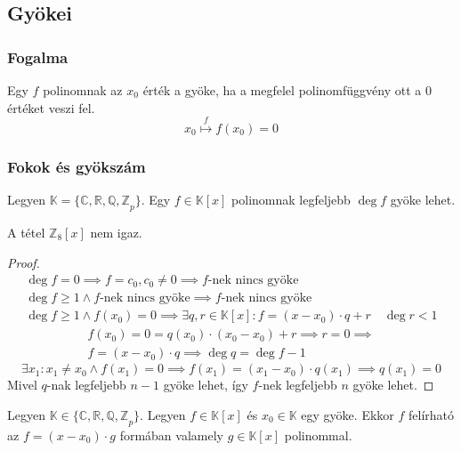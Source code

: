 \setcounter{definition}{0}
\setcounter{theorem}{0}
\subsection{Gyökei}
\subsubsection{Fogalma}
\begin{definition}
	Egy $f$ polinomnak az $x_0$ érték a gyöke,
	ha a megfelel polinomfüggvény ott a $0$ értéket veszi fel.
	\begin{equation*}
		x_0 \overset{f}{\mapsto} f(x_0) = 0
	\end{equation*}
\end{definition}
\subsubsection{Fokok és gyökszám}
\begin{theorem}
	Legyen $\mathbb{K} = \{ \mathbb{C, R, Q, Z}_p \}$.
	Egy $f \in \mathbb{K}[x]$ polinomnak legfeljebb $\deg f$ gyöke lehet.
\end{theorem}
\begin{remark*}
	A tétel $\mathbb{Z}_8[x]$ nem igaz.
\end{remark*}
\begin{proof}
	\begin{gather*}
		\deg f = 0 \implies f = c_0, c_0 \neq 0 \implies
		f\text{-nek nincs gyöke} \\
		\deg f \geq 1 \land f\text{-nek nincs gyöke} \implies
		f\text{-nek nincs gyöke} \\
		\deg f \geq 1 \land f(x_0) = 0 \implies
		\exists q, r \in \mathbb{K}[x]: f = (x - x_0) \cdot q + r \quad
		\deg r < 1
	\end{gather*}
	\begin{multline*}
		f(x_0) = 0 = q(x_0) \cdot (x_0 - x_0) + r \implies r = 0 \implies \\
		f = (x - x_0) \cdot q \implies \deg q = \deg f - 1
	\end{multline*}
	\begin{equation*}
		\exists x_1: x_1 \neq x_0 \land f(x_1) = 0 \implies
		f(x_1) = (x_1 - x_0) \cdot q(x_1) \implies q(x_1) = 0
	\end{equation*}
	Mivel $q$-nak legfeljebb $n - 1$ gyöke lehet,
	így $f$-nek legfeljebb $n$ gyöke lehet.
\end{proof}
\begin{theorem}
	Legyen $\mathbb{K} \in \{ \mathbb{C, R, Q, Z}_p \}$.
	Legyen $f \in \mathbb{K}[x]$ és $x_0 \in \mathbb{K}$ egy gyöke.
	Ekkor $f$ felírható az $f = (x - x_0) \cdot g$ formában
	valamely $g \in \mathbb{K}[x]$ polinommal.
\end{theorem}
